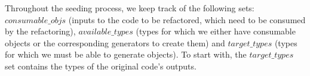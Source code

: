 \documentclass[sigconf,review,anonymous]{acmart}
\begin{document}









Throughout the seeding process, we keep track of the following sets:
$consumable\_ objs$ (inputs to the code to be refactored, which need to be consumed by the refactoring),  
$available\_types$ (types for which we either have consumable objects or the corresponding generators to create them) and 
$target\_types$ (types for which we must be able to generate objects). To start with, the $target\_types$ set
contains the types of the original code's outputs. %
\end{document}
